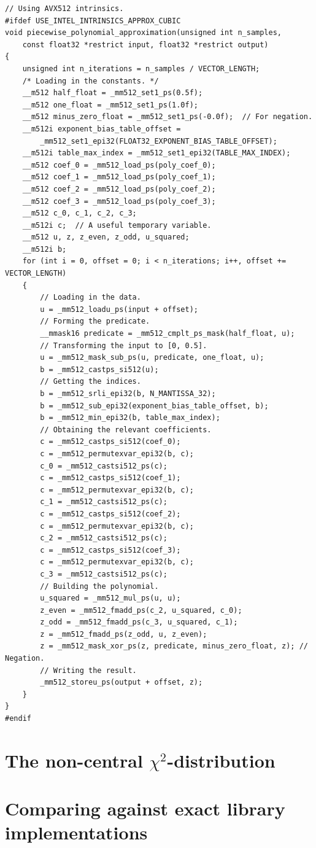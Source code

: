 \documentclass[11pt,a4paper,oneside,english]{extarticle}
\begin{document}
\begin{lstfloat}[h!tb]
\begin{lstlisting}[style=C, captionpos=b, caption={Piecewise polynomial approximation implementations using \intel intrinsics.}, label={code:c:piecewise_polynomial_approximation_use_intel_intrinsics_approx_cubic}]
// Using AVX512 intrinsics. 
#ifdef USE_INTEL_INTRINSICS_APPROX_CUBIC
void piecewise_polynomial_approximation(unsigned int n_samples, 
    const float32 *restrict input, float32 *restrict output)
{
    unsigned int n_iterations = n_samples / VECTOR_LENGTH;  
    /* Loading in the constants. */
    __m512 half_float = _mm512_set1_ps(0.5f);
    __m512 one_float = _mm512_set1_ps(1.0f);
    __m512 minus_zero_float = _mm512_set1_ps(-0.0f);  // For negation.
    __m512i exponent_bias_table_offset = 
        _mm512_set1_epi32(FLOAT32_EXPONENT_BIAS_TABLE_OFFSET);
    __m512i table_max_index = _mm512_set1_epi32(TABLE_MAX_INDEX);
    __m512 coef_0 = _mm512_load_ps(poly_coef_0);  
    __m512 coef_1 = _mm512_load_ps(poly_coef_1);
    __m512 coef_2 = _mm512_load_ps(poly_coef_2);
    __m512 coef_3 = _mm512_load_ps(poly_coef_3);
    __m512 c_0, c_1, c_2, c_3;
    __m512i c;  // A useful temporary variable.
    __m512 u, z, z_even, z_odd, u_squared;
    __m512i b;
    for (int i = 0, offset = 0; i < n_iterations; i++, offset += VECTOR_LENGTH)
    {
        // Loading in the data.
        u = _mm512_loadu_ps(input + offset);
        // Forming the predicate.
        __mmask16 predicate = _mm512_cmplt_ps_mask(half_float, u);
        // Transforming the input to [0, 0.5].
        u = _mm512_mask_sub_ps(u, predicate, one_float, u);
        b = _mm512_castps_si512(u);  
        // Getting the indices.
        b = _mm512_srli_epi32(b, N_MANTISSA_32);
        b = _mm512_sub_epi32(exponent_bias_table_offset, b);
        b = _mm512_min_epi32(b, table_max_index);
        // Obtaining the relevant coefficients.
        c = _mm512_castps_si512(coef_0);
        c = _mm512_permutexvar_epi32(b, c);
        c_0 = _mm512_castsi512_ps(c);
        c = _mm512_castps_si512(coef_1);
        c = _mm512_permutexvar_epi32(b, c);
        c_1 = _mm512_castsi512_ps(c);
        c = _mm512_castps_si512(coef_2);
        c = _mm512_permutexvar_epi32(b, c);
        c_2 = _mm512_castsi512_ps(c);
        c = _mm512_castps_si512(coef_3);
        c = _mm512_permutexvar_epi32(b, c);
        c_3 = _mm512_castsi512_ps(c);
        // Building the polynomial.
        u_squared = _mm512_mul_ps(u, u);
        z_even = _mm512_fmadd_ps(c_2, u_squared, c_0);
        z_odd = _mm512_fmadd_ps(c_3, u_squared, c_1);
        z = _mm512_fmadd_ps(z_odd, u, z_even);
        z = _mm512_mask_xor_ps(z, predicate, minus_zero_float, z); // Negation.
        // Writing the result.
        _mm512_storeu_ps(output + offset, z);
    }
}
#endif
\end{lstlisting}
\end{lstfloat}



\section{The non-central $ \chi^2 $-distribution}

\section{Comparing against exact library implementations}
\end{document}
